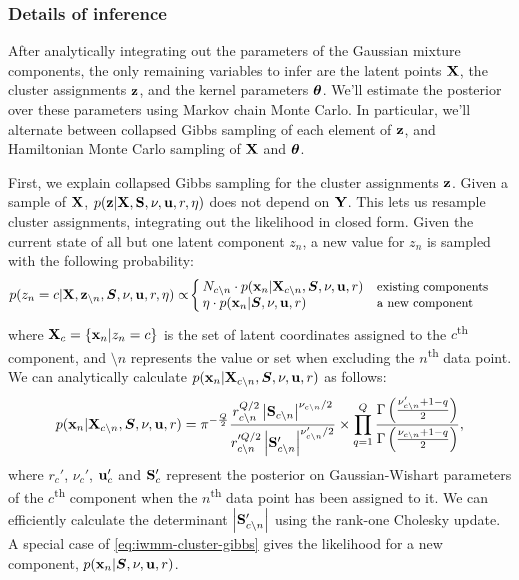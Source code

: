 \subsubsection{Details of inference}
\label{sec:iwmm-inference-details}

After analytically integrating out the parameters of the Gaussian mixture components, the only remaining variables to infer are the latent points $\mathbf{X}$, the cluster assignments ${\bf{z}}$, and the kernel parameters ${\boldsymbol{\theta}}$.
We'll estimate the posterior over these parameters using Markov chain Monte Carlo.
In particular, we'll alternate between collapsed Gibbs sampling of each element of ${\bf{z}}$, and Hamiltonian Monte Carlo sampling of $\mathbf{X}$ and ${\boldsymbol{\theta}}$.

First, we explain collapsed Gibbs sampling for the cluster assignments ${\bf{z}}$.
Given a sample of $\mathbf{X}$, $p({\bf{z}} | \mathbf{X}, \mathbf{S}, \nu, {\bf{u}}, r, \eta)$ does not depend on $\mathbf{Y}$.
This lets us resample cluster assignments, integrating out the \iGMM{} likelihood in closed form.
Given the current state of all but one latent component $z_n$, a new value for $z_n$ is sampled with the following probability:
%
\begin{align}
p(z_{n}=c|\mathbf{X},{\bf{z}}_{\setminus n},\bm{S},\nu,{\bf{u}},r,\eta)
 & \propto\!
\left\{
\begin{array}{ll}
\!\!N_{c\setminus n}\cdot p({\bf{x}}_{n}|\mathbf{X}_{c\setminus n},\bm{S},\nu,{\bf{u}},r) & \text{{\small existing components}}\\
\!\!\eta\cdot p({\bf{x}}_{n}|\bm{S},\nu,{\bf{u}},r) & \text{{\small a new component}}
\end{array}
\right.
\label{eq:gibbs}
\end{align}
%
where
$\mathbf{X}_{c}=\{{\bf{x}}_{n}|z_{n}=c\}$
is the set of latent coordinates assigned to the $c$\textsuperscript{th} component,
and $\setminus n$ represents the value or set when excluding the $n$\textsuperscript{th} data point.
We can analytically calculate $p({\bf{x}}_{n}|\mathbf{X}_{c\setminus n},\bm{S},\nu,{\bf{u}},r)$
as follows:
%
\begin{align}
p({\bf{x}}_{n}|\mathbf{X}_{c\setminus n},\bm{S},\nu,{\bf{u}},r)
=\pi^{-\frac{Q}{2}}
\frac{r_{c\setminus n} ^{Q/2} \left| \mathbf{S}_{c\setminus n}  \right|^{\nu_{c\setminus n}/2}}
     {r_{c\setminus n}'^{Q/2} \left| \mathbf{S}_{c\setminus n}' \right|^{\nu_{c\setminus n}'/2}}
\times \prod_{q=1}^{Q}
\frac{\Gamma \left( \frac{\nu_{c\setminus n}' + 1 - q}{2} \right)}
     {\Gamma \left( \frac{\nu_{c\setminus n}  + 1 - q}{2} \right)},
\label{eq:iwmm-cluster-gibbs}
\end{align}
%
where $r_{c}'$, $\nu_{c}'$, ${\bf{u}}_{c}'$ and $\mathbf{S}_{c}'$ represent the posterior on Gaussian-Wishart parameters of the $c$\textsuperscript{th} component when the $n$\textsuperscript{th} data point has been assigned to it.
We can efficiently calculate the determinant $\left| \mathbf{S}_{c\setminus n}' \right|$ using the rank-one Cholesky update.
A special case of \cref{eq:iwmm-cluster-gibbs} gives the likelihood for a new component, $p({\bf{x}}_{n}|\bm{S},\nu,{\bf{u}},r)$.



